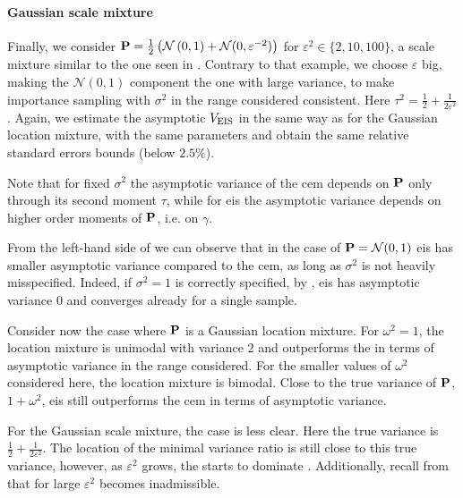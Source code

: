 \begin{example}
    \paragraph{Gaussian scale mixture}
    Finally, we consider $\P = \frac{1}{2} \left(\mathcal N \left( 0, 1 \right) + \mathcal N (0, \varepsilon^{-2}) \right)$ for $\varepsilon^{2} \in \{2, 10, 100\}$, a scale mixture similar to the one seen in . Contrary to that example, we choose $\varepsilon$ big, making the $\mathcal N(0,1)$ component the one with large variance, to make importance sampling with $\sigma^{2}$ in the range considered consistent. 
    Here $\tau^{2} = \frac{1}{2} + \frac{1}{2\varepsilon^{2}}$. 
    Again, we estimate the asymptotic $V_{\eis}$ in the same way as for the Gaussian location mixture, with the same parameters and obtain the same relative standard errors bounds (below $2.5\%$).
\end{example}
\vspace{16pt}

Note that for fixed $\sigma^{2}$ the asymptotic variance of the \gls{cem} depends on $\P$ only through its second moment $\tau$, while for \gls{eis} the asymptotic variance depends on higher order moments of $\P$, i.e. on $\gamma$.

From the left-hand side of  we can observe that in the case of $\P = \mathcal N(0,1)$ \gls{eis} has smaller asymptotic variance compared to the \gls{cem}, as long as $\sigma^{2}$ is not heavily misspecified. Indeed, if $\sigma^{2} = 1$ is correctly specified, by , \gls{eis} has asymptotic variance $0$ and converges already for a single sample. 

Consider now the case where $\P$ is a Gaussian location mixture. For $\omega^{2} = 1$, the location mixture is unimodal with variance $2$ and \aeis outperforms the \acem in terms of asymptotic variance in the range considered. For the smaller values of $\omega^{2}$ considered here, the location mixture is bimodal. Close to the true variance of $\P$, $1 + \omega^{2}$, \gls{eis} still outperforms the \gls{cem} in terms of asymptotic variance.

For the Gaussian scale mixture, the case is less clear. Here the true variance is $\frac{1}{2} + \frac{1}{2 \varepsilon^{2}}$. The location of the minimal variance ratio is still close to this true variance, however, as $\varepsilon^{2}$ grows, the \acem starts to dominate \aeis. Additionally, recall from  that for large $\varepsilon^{2}$ \aeis becomes inadmissible. 


